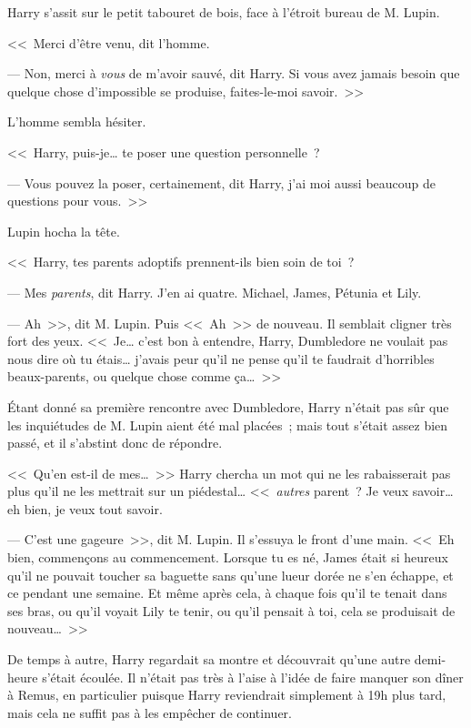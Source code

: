 Harry s'assit sur le petit tabouret de bois, face à l'étroit bureau de M. Lupin.

<<~Merci d'être venu, dit l'homme.

--- Non, merci à \emph{vous} de m'avoir sauvé, dit Harry. Si vous avez jamais besoin que quelque chose d'impossible se produise, faites-le-moi savoir.~>>

L'homme sembla hésiter.

<<~Harry, puis-je… te poser une question personnelle~?

--- Vous pouvez la poser, certainement, dit Harry, j'ai moi aussi beaucoup de questions pour vous.~>>

Lupin hocha la tête.

<<~Harry, tes parents adoptifs prennent-ils bien soin de toi~?

--- Mes \emph{parents}, dit Harry. J'en ai quatre. Michael, James, Pétunia et Lily.

--- Ah~>>, dit M. Lupin. Puis <<~Ah~>> de nouveau. Il semblait cligner très fort des yeux. <<~Je… c'est bon à entendre, Harry, Dumbledore ne voulait pas nous dire où tu étais… j'avais peur qu'il ne pense qu'il te faudrait d'horribles beaux-parents, ou quelque chose comme ça…~>>

Étant donné sa première rencontre avec Dumbledore, Harry n'était pas sûr que les inquiétudes de M. Lupin aient été mal placées~; mais tout s'était assez bien passé, et il s'abstint donc de répondre.

<<~Qu'en est-il de mes…~>> Harry chercha un mot qui ne les rabaisserait pas plus qu'il ne les mettrait sur un piédestal… <<~\emph{autres} parent~? Je veux savoir… eh bien, je veux tout savoir.

--- C'est une gageure~>>, dit M. Lupin. Il s'essuya le front d'une main. <<~Eh bien, commençons au commencement. Lorsque tu es né, James était si heureux qu'il ne pouvait toucher sa baguette sans qu'une lueur dorée ne s'en échappe, et ce pendant une semaine. Et même après cela, à chaque fois qu'il te tenait dans ses bras, ou qu'il voyait Lily te tenir, ou qu'il pensait à toi, cela se produisait de nouveau…~>>

\later

De temps à autre, Harry regardait sa montre et découvrait qu'une autre demi-heure s'était écoulée. Il n'était pas très à l'aise à l'idée de faire manquer son dîner à Remus, en particulier puisque Harry reviendrait simplement à 19h plus tard, mais cela ne suffit pas à les empêcher de continuer.

